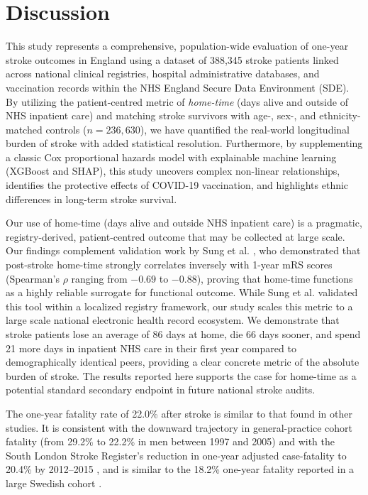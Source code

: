 \section{Discussion}

This study represents a comprehensive, population-wide evaluation of one-year stroke outcomes in England using a dataset of 388,345 stroke patients linked across national clinical registries, hospital administrative databases, and vaccination records within the NHS England Secure Data Environment (SDE). By utilizing the patient-centred metric of \textit{home-time} (days alive and outside of NHS inpatient care) and matching stroke survivors with age-, sex-, and ethnicity-matched controls ($n = 236,630$), we have quantified the real-world longitudinal burden of stroke with added statistical resolution. Furthermore, by supplementing a classic Cox proportional hazards model with explainable machine learning (XGBoost and SHAP), this study uncovers complex non-linear relationships, identifies the protective effects of COVID-19 vaccination, and highlights ethnic differences in long-term stroke survival.

Our use of home-time (days alive and outside NHS inpatient care) is a  pragmatic, registry-derived, patient-centred outcome that may be collected at large scale. Our findings complement validation work by Sung et al. \cite{sung2020home}, who demonstrated that post-stroke home-time strongly correlates inversely with 1-year mRS scores (Spearman's $\rho$ ranging from $-0.69$ to $-0.88$), proving that home-time functions as a highly reliable surrogate for functional outcome. While Sung et al. validated this tool within a localized registry framework, our study scales this metric to a large scale national electronic health record ecosystem. We demonstrate that stroke patients lose an average of 86 days at home, die 66 days sooner, and spend 21 more days in inpatient NHS care in their first year compared to demographically identical peers, providing a clear concrete metric of the absolute burden of stroke. The results reported here  supports the case for home-time as a potential standard secondary endpoint in future national stroke audits.

The one-year fatality rate of 22.0\% after stroke is similar to that found in other studies. It is consistent with the downward trajectory in general-practice cohort fatality (from 29.2\% to 22.2\% in men between 1997 and 2005) \cite{gulliford_declining_2010} and with the South London Stroke Register's reduction in one-year adjusted case-fatality to 20.4\% by 2012--2015 \cite{wafa_long-term_2020}, and is similar to the 18.2\% one-year fatality reported in a large Swedish cohort \cite{ullberg_changes_2015}.

